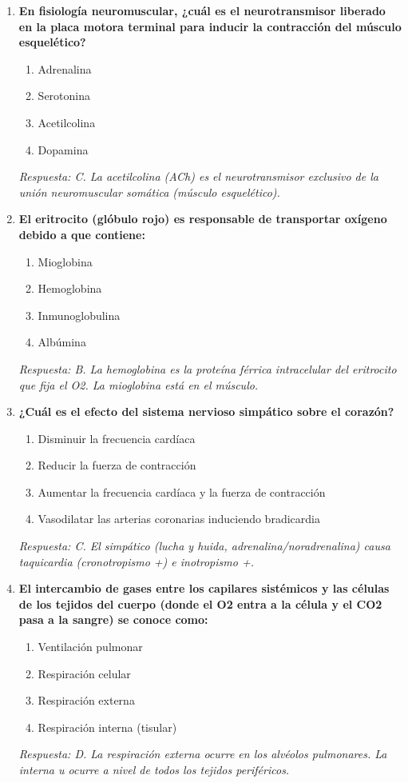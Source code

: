 \begin{enumerate}[label=\textbf{\arabic*.}]
    \item \textbf{En fisiología neuromuscular, ¿cuál es el neurotransmisor liberado en la placa motora terminal para inducir la contracción del músculo esquelético?}
    \begin{enumerate}
        \item[A)] Adrenalina
        \item[B)] Serotonina
        \item[C)] Acetilcolina
        \item[D)] Dopamina
    \end{enumerate}
    \textit{Respuesta: C. La acetilcolina (ACh) es el neurotransmisor exclusivo de la unión neuromuscular somática (músculo esquelético).}

    \item \textbf{El eritrocito (glóbulo rojo) es responsable de transportar oxígeno debido a que contiene:}
    \begin{enumerate}
        \item[A)] Mioglobina
        \item[B)] Hemoglobina
        \item[C)] Inmunoglobulina
        \item[D)] Albúmina
    \end{enumerate}
    \textit{Respuesta: B. La hemoglobina es la proteína férrica intracelular del eritrocito que fija el O2. La mioglobina está en el músculo.}

    \item \textbf{¿Cuál es el efecto del sistema nervioso simpático sobre el corazón?}
    \begin{enumerate}
        \item[A)] Disminuir la frecuencia cardíaca
        \item[B)] Reducir la fuerza de contracción
        \item[C)] Aumentar la frecuencia cardíaca y la fuerza de contracción
        \item[D)] Vasodilatar las arterias coronarias induciendo bradicardia
    \end{enumerate}
    \textit{Respuesta: C. El simpático (lucha y huida, adrenalina/noradrenalina) causa taquicardia (cronotropismo +) e inotropismo +.}

    \item \textbf{El intercambio de gases entre los capilares sistémicos y las células de los tejidos del cuerpo (donde el O2 entra a la célula y el CO2 pasa a la sangre) se conoce como:}
    \begin{enumerate}
        \item[A)] Ventilación pulmonar
        \item[B)] Respiración celular
        \item[C)] Respiración externa
        \item[D)] Respiración interna (tisular)
    \end{enumerate}
    \textit{Respuesta: D. La respiración externa ocurre en los alvéolos pulmonares. La interna u ocurre a nivel de todos los tejidos periféricos.}


\end{enumerate}
